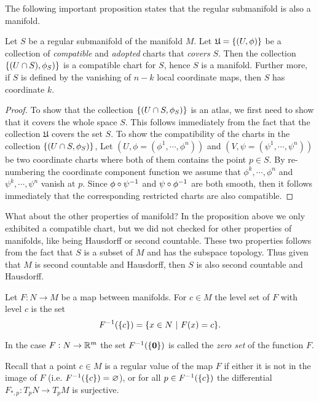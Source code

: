 The following important proposition states that the regular submanifold is also a manifold.

\begin{proposition}
	Let $ S $ be a regular submanifold of the manifold $ M $. Let $ \mathfrak{U} = 
	\{(U,\phi)\} $ be a collection of \emph{compatible} and \emph{adopted} charts that \emph{covers} $ S $. Then the collection $ \{(U\cap S), \phi_S)\} $ is a compatible chart for $ S $, hence $ S $ is a manifold. Further more, if $ S $ is defined by the vanishing of $ n-k $ local coordinate maps, then $ S $ has coordinate $ k $.
\end{proposition}

\begin{proof}
	To show that the collection $ \{(U\cap S,\phi_S)\} $ is an atlas, we first need to show that it covers the whole space $ S $. This follows immediately from the fact that the collection $ \mathfrak{U} $ covers the set $ S $. To show the compatibility of the charts in the collection $ \{(U\cap S, \phi_S)\} $, Let $ (U,\phi = (\phi^1,\cdots,\phi^n)) $ and $ (V,\psi=(\psi^1,\cdots,\psi^n)) $ be two coordinate charts where both of them contains the point $ p \in S $. By re-numbering the coordinate component function we assume that $ \phi^k, \cdots, \phi^n $ and $ \psi^k,\cdots, \psi^n $ vanish at $ p $. Since $ \phi\circ\psi^{-1}  $ and $ \psi\circ\phi^{-1} $ are both smooth, then it follows immediately that the corresponding restricted charts are also compatible.
\end{proof}

\begin{carefull}
	What about the other properties of manifold? In the proposition above we only exhibited a compatible chart, but we did not checked for other properties of manifolds, like being Hausdorff or second countable. These two properties follows from the fact that $ S $ is a subset of $ M $ and has the subspace topology. Thus given that $ M $ is second countable and Hausdorff, then $ S $ is also second countable and Hausdorff.
\end{carefull}

\begin{definition}
	Let $ F: N \to M $ be a map between manifolds. For $ c \in M $ the level set of $ F $ with level $ c $ is the set 
	\[ \inv{F}(\set{c}) = \set{x \in N\ |\ F(x) = c}. \]
\end{definition}
\begin{remark}
	In the case $ F : N \to \mathbb{R}^m $ the set $ F^{-1}(\{\mathbf{0}\}) $ is called the \textit{zero set} of the function $ F $.
\end{remark}
\begin{remark}
	Recall that a point $ c \in M $ is a regular value of the map $ F $ if either it is not in the image of $ F $ (i.e. $ F^{-1}(\{c\}) = \varnothing $), or for all $ p \in F^{-1}(\{c\}) $ the differential $ F_{*,p} : T_p N \to T_pM $ is surjective. 
\end{remark}

